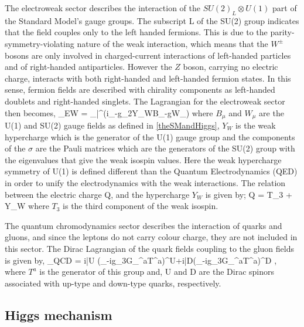 The electroweak sector describes the interaction of the $SU(2)_L\otimes U(1)$ part of the Standard Model's gauge groups. The subscript L of the SU(2) group indicates that the field couples only to the left handed fermions. This is due to the parity-symmetry-violating nature of the weak interaction, which means that the $W^\pm$ bosons are only involved in charged-current interactions of left-handed particles and of right-handed antiparticles. However the $Z$ boson, carrying no electric charge, interacts with both right-handed and left-handed fermion states. In this sense, fermion fields are described with chirality components as left-handed doublets and right-handed singlets. The Lagrangian for the electroweak sector then becomes,
\be
\Lag_{EW} = \sum_\psi\bar\psi\gamma^\mu\left(i\partial_\mu -g_2Y_WB_\mu-g\sigma W_\mu\right)\psi
\ee
where $B_\mu$ and $W_\mu$ are the U(1) and SU(2) gauge fields as defined in \autoref{theSMandHiggs}, $Y_W$ is the weak hypercharge which is the generator of the U(1) gauge group and the components of the $\sigma$ are the Pauli matrices which are the generators of the SU(2) group with the eigenvalues that give the weak isospin values. Here the weak hypercharge symmetry of U(1) is defined different than the Quantum Electrodynamics (QED) in order to unify the electrodynamics with the weak interactions. The relation between the electric charge Q, and the hypercharge $Y_W$ is given by;
\be
Q = T_3 + Y_W
\ee
where $T_3$ is the third component of the weak isospin.

The quantum chromodynamics sector describes the interaction of quarks and gluons, and since the leptons do not carry colour charge, they are not included in this sector. The Dirac Lagrangian of the quark fields coupling to the gluon fields is given by,
\be
\Lag_{QCD} = i\bar U \left(\partial_\mu-ig_3G_\mu^aT^a\right)\gamma^\mu U+i\bar D\left(\partial_\mu-ig_3G_\mu^aT^a\right)\gamma^\mu D ,
\ee
where $T^a$ is the generator of this group and, U and D are the Dirac spinors associated with up-type and down-type quarks, respectively.

\subsection{Higgs mechanism}

